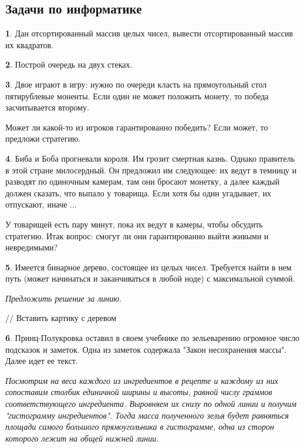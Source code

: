 \documentclass[14pt, a4paper]{extarticle}
\theoremstyle{definition}
\newtheorem{problem}{}
\theoremstyle{definition}
\theoremstyle{remark}
\numberwithin{equation}{section}
\begin{document}
\subsection*{Задачи по информатике}

\begin{problem}
    Дан отсортированный массив целых чисел, вывести 
    отсортированный массив их квадратов.
\end{problem}

\begin{problem}
    Построй очередь на двух стеках.
\end{problem}

\begin{problem}
    Двое играют в игру: нужно по очереди класть на прямоугольный
    стол пятирублевые моненты. Если один не может положить 
    монету, то победа засчитывается второму.

    Может ли какой-то из игроков гарантированно победить? Если может,
    то предложи стратегию.
\end{problem}

\begin{problem}
    Биба и Боба прогневали короля. Им грозит смертная казнь.
    Однако правитель в этой стране милосердный. Он предложил
    им следующее: их ведут в темницу и разводят по одиночным камерам,
    там они бросают монетку, а далее каждый должен сказать,
    что выпало у товарища. Если хотя бы один угадывает, их отпускают, 
    иначе ...

    У товарищей есть пару минут, пока их ведут в камеры, чтобы 
    обсудить стратегию. Итак вопрос: смогут ли они гарантированно выйти
    живыми и невредимыми?
\end{problem}

\begin{problem}
    Имеется бинарное дерево, состоящее из целых чисел.
    Требуется найти в нем путь (может начинаться и 
    заканчиваться в любой ноде) с максимальной суммой.

    \textit{Предложить решение за линию.}

    // Вставить картику с деревом
\end{problem}

\begin{problem}
    Принц-Полукровка оставил в своем учебнике по зельеварению 
    огромное число подсказок и заметок. Одна из заметок содержала 
    "Закон несохранения массы". Далее идет ее текст.

    \textit{Посмотрим на веса каждого из ингредиентов в рецепте и 
    каждому из них сопоставим столбик единичной ширины и высоты, 
    равной числу граммов соответствующего ингредиента. 
    Выровняем их снизу по одной линии и получим "гистограмму 
    ингредиентов". Тогда масса полученного зелья будет равняться 
    площади самого большого прямоугольника в гистограмме, одна 
    из сторон которого лежит на общей нижней линии.}
\end{problem}
\end{document}
